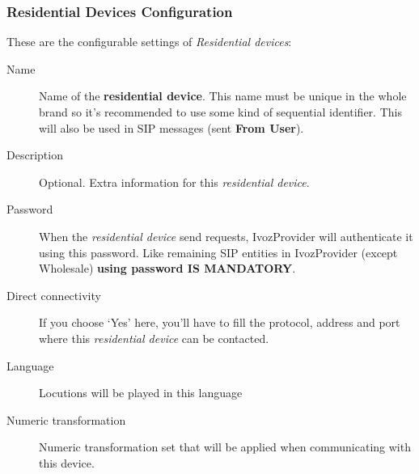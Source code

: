 \documentclass[letterpaper,10pt,english]{sphinxmanual}
\begin{document}
\subsubsection{Residential Devices Configuration}
\label{administration_portal/client/residential/residential_devices:residential-devices-configuration}
These are the configurable settings of \emph{Residential devices}:
\begin{description}
\item[{Name}] \leavevmode{}\label{administration_portal/client/residential/residential_devices:term-name}
Name of the \textbf{residential device}. This name must be unique in the whole brand so
it's recommended to use some kind of sequential identifier. This will also be used
in SIP messages (sent \textbf{From User}).

\item[{Description}] \leavevmode{}\label{administration_portal/client/residential/residential_devices:term-description}
Optional. Extra information for this \emph{residential device}.

\item[{Password}] \leavevmode{}\label{administration_portal/client/residential/residential_devices:term-password}
When the \emph{residential device} send requests, IvozProvider will authenticate it using
this password. Like remaining SIP entities in IvozProvider (except Wholesale) \textbf{using password IS MANDATORY}.

\item[{Direct connectivity}] \leavevmode{}\label{administration_portal/client/residential/residential_devices:term-direct-connectivity}
If you choose `Yes' here, you'll have to fill the protocol, address and
port where this \emph{residential device} can be contacted.

\item[{Language}] \leavevmode{}\label{administration_portal/client/residential/residential_devices:term-language}
Locutions will be played in this language

\item[{Numeric transformation}] \leavevmode{}\label{administration_portal/client/residential/residential_devices:term-numeric-transformation}
Numeric transformation set that will be applied when communicating with this device.


\end{description}
\end{document}
